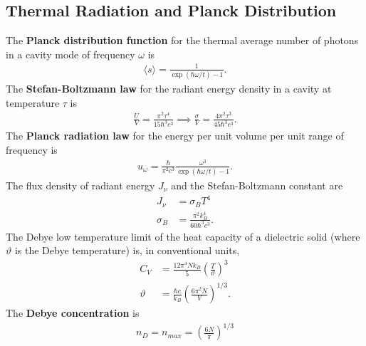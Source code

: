 \begin{multicols}{2}
	\section{Thermal Radiation and Planck Distribution}
	The \textbf{Planck distribution function} for the thermal average number of photons in a cavity mode of frequency $\omega$ is
	\begin{align}
		\langle s \rangle = \frac{1}{\exp(\hbar \omega/t)-1}.
	\end{align}
	The \textbf{Stefan-Boltzmann law} for the radiant energy density in a cavity at temperature $\tau$ is
	\begin{align}
		\frac{U}{V} = \frac{\pi^2\tau^4}{15\hbar^3 c^3} \implies \frac{\sigma}{V} = \frac{4\pi^2\tau^3}{45\hbar^3 c^3}.	
	\end{align}
	The \textbf{Planck radiation law} for the energy per unit volume per unit range of frequency is
	\begin{align}
		u_\omega = \frac{\hbar}{\pi^2c^3}\frac{\omega^3}{\exp(\hbar \omega/t)-1}.
	\end{align}
	The flux density of radiant energy $J_\nu$ and the Stefan-Boltzmann constant are
	\begin{align}
		J_\nu &= \sigma_BT^4 \\
		\sigma_B &= \frac{\pi^2k_B^4}{60\hbar^3c^3}.
	\end{align}
	The Debye low temperature limit of the heat capacity of a dielectric solid (where $\vartheta$ is the Debye temperature) is, in conventional units,
	\begin{align}
		C_V &= \frac{12\pi^4Nk_B}{5}\left(\frac{T}{\vartheta}\right)^3 \\
		\vartheta &= \frac{\hbar c}{k_B}\left(\frac{6\pi^2N}{V}\right)^{1/3}.
	\end{align}
	The \textbf{Debye concentration} is
	\begin{align}
		n_D=n_{max} = \left(\frac{6N}{\pi}\right)^{1/3}
	\end{align}

\end{multicols}
